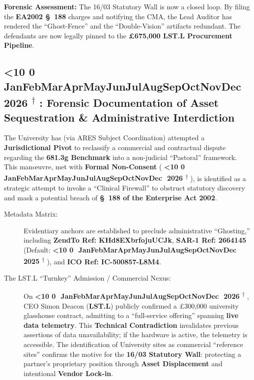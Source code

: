 \documentclass{EMBASSY}
\DeclareRobustCommand{\gmt}[3]{%
    \texorpdfstring{%
        {\color{DateGold}\textbf{%
            \ifnum#1<10 0\fi#1\,\textperiodcentered\,%
            \ifcase#2\or Jan\or Feb\or Mar\or Apr\or May\or Jun\or Jul\or Aug\or Sep\or Oct\or Nov\or Dec\fi
            \,\textperiodcentered\,20#3%
            \textsuperscript{$\dagger$}%
        }}%
    }{%
        (#1/#2/#3)%
    }%
}
\begin{document}
\textbf{Forensic Assessment:} The 16/03 Statutory Wall is now a closed loop. By filing the \textbf{EA2002 \S~188} charges and notifying the CMA, the Lead Auditor has rendered the ``Ghost-Fence'' and the ``Double-Vision'' artifacts redundant. The defendants are now legally pinned to the \textbf{\pounds675,000 LST.L Procurement Pipeline}.

\subsection{\gmt{17}{4}{26}: Forensic Documentation of Asset Sequestration \& Administrative Interdiction}
The University has (via ARES Subject Coordination) attempted a \textbf{Jurisdictional Pivot} to reclassify a commercial and contractual dispute regarding the \textbf{681.3g Benchmark} into a non-judicial ``Pastoral'' framework. This man\oe uvre, met with \textbf{Formal Non-Consent} (\gmt{16}{4}{26}), is identified as a strategic attempt to invoke a ``Clinical Firewall'' to obstruct statutory discovery and mask a potential breach of \textbf{\S~188 of the Enterprise Act 2002}.

\begin{description}
	\item[Metadata Matrix:] Evidentiary anchors are established to preclude administrative ``Ghosting,'' including \textbf{ZendTo Ref: KHd8EXbrfojuUCJk}, \textbf{SAR-1 Ref: 2664145} (Default: \gmt{30}{12}{25}), and \textbf{ICO Ref: IC-500857-L8M4}.
	\item[The LST.L ``Turnkey'' Admission / Commercial Nexus:] On \gmt{15}{04}{26}, CEO Simon Deacon (\textbf{LST.L}) publicly confirmed a \pounds300,000 university glasshouse contract, admitting to a ``full-service offering'' spanning \textbf{live data telemetry}. This \textbf{Technical Contradiction} invalidates previous assertions of data unavailability; if the hardware is active, the telemetry is accessible. The identification of University sites as commercial ``reference sites'' confirms the motive for the \textbf{16/03 Statutory Wall}: protecting a partner's proprietary position through \textbf{Asset Displacement} and intentional \textbf{Vendor Lock-in}.
\end{description}
\end{document}
